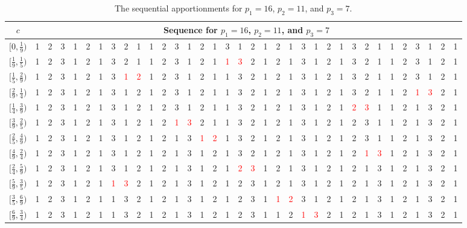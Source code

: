 \documentclass[pdflatex,sn-mathphys-num]{sn-jnl}
\theoremstyle{thmstyleone}%
\theoremstyle{thmstyletwo}%
\theoremstyle{thmstylethree}%
\begin{document}
\begin{table}
 \caption{The sequential apportionments for $p_1=16$, $p_2=11$, and $p_3 = 7$.}
 \label{16-11-7}
\renewcommand{\arraystretch}{1.2}
\setlength{\tabcolsep}{2pt}
\begin{tabular}{c|*{34}c}
$c$ & \multicolumn{34}{c}{Sequence for $p_1 = 16$, $p_2 = 11$, and $p_3 = 7$}  \\
\hline 
$[0, \frac{1}{9} )$ &1 & 2 & 3 & 1 & 2 & 1 & 3 & 2 & 1 & 1 & 2 & 3 & 1 & 2 & 1 & 3 & 1 & 2 & 1 & 2 & 1 & 3 & 1 & 2 & 1 & 3 & 2 & 1 & 1 & 2 & 3 & 1 & 2 & 1  \\
$[\frac{1}{9}, \frac{1}{5} )$ & 1 & 2 & 3 & 1 & 2 & 1 & 3 & 2 & 1 & 1 & 2 & 3 & 1 & 2 & 1 & \textcolor{red}{1} & \textcolor{red}{3} & 2 & 1 & 2 & 1 & 3 & 1 & 2 & 1 & 3 & 2 & 1 & 1 & 2 & 3 & 1 & 2 & 1 \\
$[\frac{1}{5}, \frac{2}{9} )$ &  1& 2&3&1&2&1&3&\textcolor{red}{1}&\textcolor{red}{2}&1&2&3&1&2&1&1&3&2&1&2&1&3&1&2&1&3&2&1&1&2&3&1&2&1\\
$[\frac{2}{9}, \frac{1}{4} )$ &1&2&3&1&2&1&3&1&2&1&2&3&1&2&1&1&3&2&1&2&1&3&1&2&1&3&2&1&1&2&\textcolor{red}{1}&\textcolor{red}{3}&2&1\\
$[\frac{1}{4}, \frac{3}{9} )$ &1&2&3&1&2&1&3&1&2&1&2&3&1&2&1&1&3&2&1&2&1&3&1&2&1&\textcolor{red}{2}&\textcolor{red}{3}&1&1&2&1&3&2&1\\
$[\frac{3}{9}, \frac{2}{5} )$ &1&2&3&1&2&1&3&1&2&1&2&\textcolor{red}{1}&\textcolor{red}{3}&2&1&1&3&2&1&2&1&3&1&2&1&2&3&1&1&2&1&3&2&1  \\
$[\frac{2}{5}, \frac{4}{9} )$ &1&2&3&1&2&1&3&1&2&1&2&1&3&\textcolor{red}{1}&\textcolor{red}{2}&1&3&2&1&2&1&3&1&2&1&2&3&1&1&2&1&3&2&1  \\
$[\frac{4}{9}, \frac{2}{4} )$ &1&2&3&1&2&1&3&1&2&1&2&1&3&1&2&1&3&2&1&2&1&3&1&2&1&2&\textcolor{red}{1}&\textcolor{red}{3}&1&2&1&3&2&1  \\
$[\frac{2}{4}, \frac{5}{9} )$ &1&2&3&1&2&1&3&1&2&1&2&1&3&1&2&1&\textcolor{red}{2}&\textcolor{red}{3}&1&2&1&3&1&2&1&2&1&3&1&2&1&3&2&1  \\ 
$[\frac{5}{9}, \frac{3}{5} )$ &1&2&3&1&2&1&\textcolor{red}{1}&\textcolor{red}{3}&2&1&2&1&3&1&2&1&2&3&1&2&1&3&1&2&1&2&1&3&1&2&1&3&2&1  \\ 
$[\frac{3}{5}, \frac{6}{9} )$ &1&2&3&1&2&1&1&3&2&1&2&1&3&1&2&1&2&3&1&\textcolor{red}{1}&\textcolor{red}{2}&3&1&2&1&2&1&3&1&2&1&3&2&1  \\ 
$[\frac{6}{9}, \frac{3}{4} )$ &1&2&3&1&2&1&1&3&2&1&2&1&3&1&2&1&2&3&1&1&2&\textcolor{red}{1}&\textcolor{red}{3}&2&1&2&1&3&1&2&1&3&2&1  \\ 

\end{tabular}
\end{table}
\end{document}
